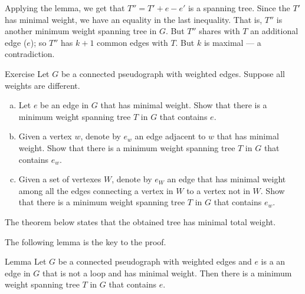 Applying the lemma, we get that $T''=T'+e-e'$ is a spanning tree.
Since the $T'$ has minimal weight, we have an equality in the last inequality.
That is, $T''$ is another minimum weight spanning tree in $G$.
But $T''$ shares with $T$ an additional edge ($e$);
so $T''$ has $k+1$ common edges with $T$.
But $k$ is maximal --- a contradiction.
\qeds

\begin{thm}{Exercise}
Let $G$ be a connected pseudograph with weighted edges.
Suppose all weights are different.
\begin{enumerate}[(a)]
\item Let $e$ be an edge in $G$ that has minimal weight.
Show that there is a minimum weight spanning tree $T$ in $G$ that contains $e$.
\item Given a vertex $w$, denote by $e_w$ an edge adjacent to $w$ that has minimal weight.
Show that there is a minimum weight spanning tree $T$ in $G$ that contains $e_w$.
\item Given a set of vertexes $W$, denote by $e_W$ an edge that has minimal weight among all the edges connecting a vertex in $W$ to a vertex not in $W$.
Show that there is a minimum weight spanning tree $T$ in $G$ that contains $e_w$.
\end{enumerate}

\end{thm}



































The theorem below states that the obtained tree has minimal total weight.



The following lemma is the key to the proof.

\begin{thm}{Lemma}\label{lem:kruskal}
Let $G$ be a connected pseudograph with weighted edges and $e$ is a an edge in $G$ that is not a loop and has minimal weight.
Then there is a minimum weight spanning tree $T$ in $G$ that contains $e$.
\end{thm}

